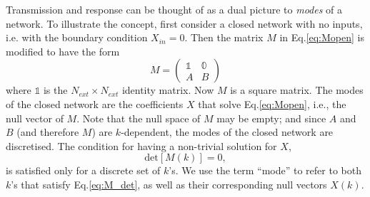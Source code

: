 Transmission and response can be thought of as a dual picture to \textit{modes} of a network. To illustrate the concept, first consider a closed network with no inputs, i.e. with the boundary condition $X_{in}=0$. Then the matrix $M$ in Eq.\ref{eq:Mopen} is modified to have the form 
\begin{equation}
    \label{eq:Mclose}
    M = \begin{pmatrix}\mathbb{1} & \mathbb{0} \\
                        A         & B  \end{pmatrix}
\end{equation}
where $\mathbb{1}$ is the $N_{ext}\times N_{ext}$ identity matrix. Now $M$ is a square matrix. The modes of the closed network are the coefficients $X$ that solve Eq.\ref{eq:Mopen}, i.e., the null vector of $M$. Note that the null space of $M$ may be empty; and since $A$ and $B$ (and therefore $M$) are $k$-dependent, the modes of the closed network are discretised. The condition for having a non-trivial solution for $X$,
\begin{equation}
\label{eq:M_det}
    \textrm{det}[M(k)]=0,
\end{equation}
is satisfied only for a discrete set of $k$'s. We use the term ``mode'' to refer to both $k$'s that satisfy Eq.\ref{eq:M_det}, as well as their corresponding null vectors $X(k)$.

